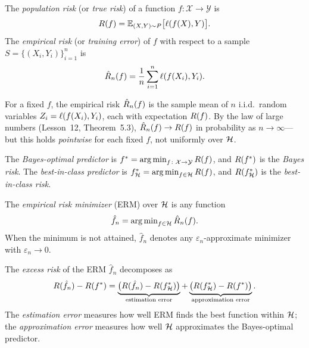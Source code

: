 \documentclass[11pt,a4paper]{article}
\begin{document}
\begin{definition}
\label{def:risk}
The \emph{population risk} (or \emph{true risk}) of a function
$f \colon \mathcal{X} \to \mathcal{Y}$ is
\[
    R(f) = \mathbb{E}_{(X, Y) \sim P}\bigl[\ell(f(X), Y)\bigr].
\]
The \emph{empirical risk} (or \emph{training error}) of $f$ with
respect to a sample $S = \{(X_i, Y_i)\}_{i=1}^n$ is
\[
    \hat{R}_n(f) = \frac{1}{n}\sum_{i=1}^n \ell(f(X_i), Y_i).
\]
\end{definition}

\begin{remark}
\label{rem:risk_rv}
For a fixed $f$, the empirical risk $\hat{R}_n(f)$ is the sample mean
of $n$ i.i.d.\ random variables $Z_i = \ell(f(X_i), Y_i)$, each with
expectation $R(f)$.  By the law of large numbers (Lesson~12,
Theorem~5.3), $\hat{R}_n(f) \to R(f)$ in probability as
$n \to \infty$---but this holds \emph{pointwise} for each fixed $f$,
not uniformly over $\mathcal{H}$.
\end{remark}

\begin{definition}
\label{def:bayes_risk}
The \emph{Bayes-optimal predictor} is
$f^* = \operatorname{arg\,min}_{f \colon \mathcal{X} \to \mathcal{Y}} R(f)$,
and $R(f^*)$ is the \emph{Bayes risk}.  The \emph{best-in-class
predictor} is $f_{\mathcal{H}}^* = \operatorname{arg\,min}_{f \in \mathcal{H}} R(f)$, and
$R(f_{\mathcal{H}}^*)$ is the \emph{best-in-class risk}.
\end{definition}

\begin{definition}
\label{def:erm}
The \emph{empirical risk minimizer} (ERM) over $\mathcal{H}$ is any
function
\[
    \hat{f}_n = \operatorname{arg\,min}_{f \in \mathcal{H}} \hat{R}_n(f).
\]
When the minimum is not attained, $\hat{f}_n$ denotes any
$\varepsilon_n$-approximate minimizer with $\varepsilon_n \to 0$.
\end{definition}

\begin{definition}
\label{def:excess_risk}
The \emph{excess risk} of the ERM $\hat{f}_n$ decomposes as
\[
    R(\hat{f}_n) - R(f^*)
    = \underbrace{\bigl(R(\hat{f}_n) - R(f_{\mathcal{H}}^*)\bigr)}_{\text{estimation error}}
    + \underbrace{\bigl(R(f_{\mathcal{H}}^*) - R(f^*)\bigr)}_{\text{approximation error}}.
\]
The \emph{estimation error} measures how well ERM finds the best function
within $\mathcal{H}$; the \emph{approximation error} measures how well
$\mathcal{H}$ approximates the Bayes-optimal predictor.
\end{definition}
\end{document}
